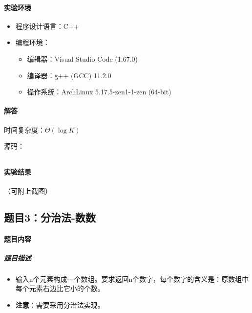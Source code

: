 \documentclass[12pt,a4paper]{ctexart}
\begin{document}
\vspace{5pt}

\paragraph{实验环境}
\begin{itemize}
    \item 程序设计语言：C++
    \item 编程环境：
    \begin{itemize}
        \item 编辑器：Visual Studio Code (1.67.0)
        \item 编译器：g++ (GCC) 11.2.0
        \item 操作系统：ArchLinux 5.17.5-zen1-1-zen (64-bit)
    \end{itemize}
\end{itemize}

\vspace{5pt}

\paragraph{解答} 时间复杂度：$\Theta(\log K)$

源码：
\inputminted[bgcolor=codebg,frame=lines,autogobble,linenos=true,breaklines]{cpp}{src/t2.cpp}

\vspace{5pt}

\paragraph{实验结果}
（可附上截图）

\newpage

\subsection*{题目3：分治法-数数}
\paragraph{题目内容}
\subparagraph{题目描述}

\begin{itemize}
    \item 输入n个元素构成一个数组。要求返回n个数字，每个数字的含义是：原数组中每个元素右边比它小的个数。
    \item \textbf{注意}：需要采用分治法实现。
\end{itemize}
\end{document}
